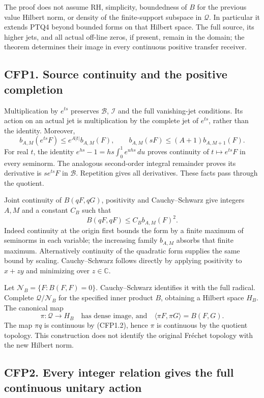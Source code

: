The proof does not assume RH, simplicity, boundedness of \(B\) for the
previous value Hilbert norm, or density of the finite-support subspace
in \(\mathcal Q\). In particular it extends PTQ4 beyond bounded forms on
that Hilbert space. The full source, its higher jets, and all actual
off-line zeros, if present, remain in the domain; the theorem determines
their image in every continuous positive transfer receiver.

\subsection{CFP1. Source continuity and the positive
completion}\label{cfp1.-source-continuity-and-the-positive-completion}

Multiplication by \(e^{ts}\) preserves \(\mathcal B\), \(\mathcal I\)
and the full vanishing-jet conditions. Its action on an actual jet is
multiplication by the complete jet of \(e^{ts}\), rather than the
identity. Moreover, \[
b_{A,M}(e^{ts}F)\le e^{A|t|}b_{A,M}(F),\qquad
b_{A,M}(sF)\le(A+1)b_{A,M+1}(F).
\tag{CFP1.1}
\] For real \(t\), the identity \(e^{hs}-1=hs\int_0^1e^{uhs}\,du\)
proves continuity of \(t\mapsto e^{ts}F\) in every seminorm. The
analogous second-order integral remainder proves its derivative is
\(se^{ts}F\) in \(\mathcal B\). Repetition gives all derivatives. These
facts pass through the quotient.

Joint continuity of \(B(qF,qG)\), positivity and Cauchy--Schwarz give
integers \(A,M\) and a constant \(C_B\) such that \[
B(qF,qF)\le C_B b_{A,M}(F)^2.
\tag{CFP1.2}
\] Indeed continuity at the origin first bounds the form by a finite
maximum of seminorms in each variable; the increasing family \(b_{A,M}\)
absorbs that finite maximum. Alternatively continuity of the quadratic
form supplies the same bound by scaling. Cauchy--Schwarz follows
directly by applying positivity to \(x+zy\) and minimizing over
\(z\in\mathbb C\).

Let \(\mathcal N_B=\{F:B(F,F)=0\}\). Cauchy--Schwarz identifies it with
the full radical. Complete \(\mathcal Q/\mathcal N_B\) for the specified
inner product \(B\), obtaining a Hilbert space \(H_B\). The canonical
map \[
\pi:\mathcal Q\longrightarrow H_B
\quad\text{has dense image, and}\quad
\langle\pi F,\pi G\rangle=B(F,G).
\tag{CFP1.3}
\] The map \(\pi q\) is continuous by (CFP1.2), hence \(\pi\) is
continuous by the quotient topology. This construction does not identify
the original Fréchet topology with the new Hilbert norm.

\subsection{CFP2. Every integer relation gives the full continuous
unitary
action}\label{cfp2.-every-integer-relation-gives-the-full-continuous-unitary-action}

